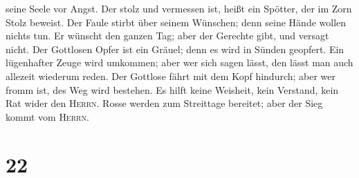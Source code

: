 seine Seele vor Angst.  Der stolz und vermessen ist,
heißt ein Spötter, der im Zorn Stolz beweist.  Der Faule
stirbt über seinem Wünschen; denn seine Hände wollen nichts tun.
 Er wünscht den ganzen Tag; aber der Gerechte gibt, und
versagt nicht.  Der Gottlosen Opfer ist ein Gräuel; denn
es wird in Sünden geopfert.  Ein lügenhafter Zeuge wird
umkommen; aber wer sich sagen lässt, den lässt man auch allezeit
wiederum reden.  Der Gottlose fährt mit dem Kopf
hindurch; aber wer fromm ist, des Weg wird bestehen.  Es
hilft keine Weisheit, kein Verstand, kein Rat wider den \textsc{Herrn}.
 Rosse werden zum Streittage bereitet; aber der Sieg
kommt vom \textsc{Herrn}.

\hypertarget{section-21}{%
\section{22}\label{section-21}}

